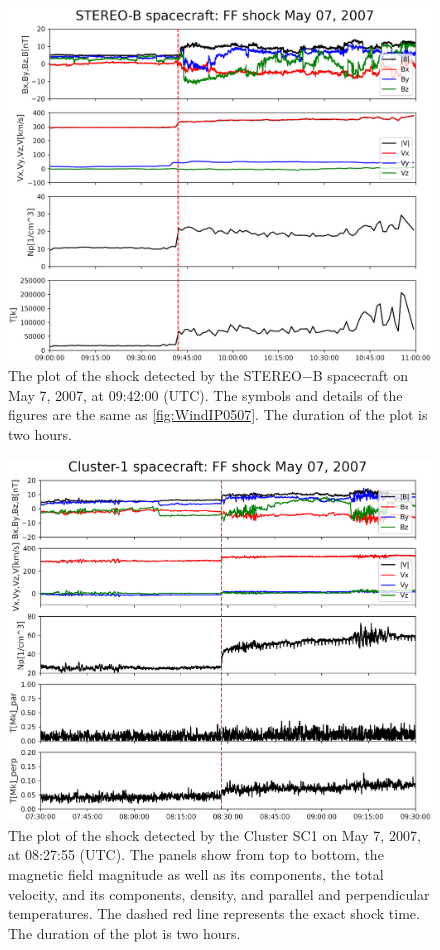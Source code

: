 \documentclass[draft]{agujournal2019}
\begin{document}
\pagebreak

\begin{figure}[!t]
\centering
\includegraphics[width=1.\textwidth]{jgr-2023-ipshocks-f03.eps}
\caption{The plot of the shock detected by the STEREO$-$B spacecraft on May 7, 2007, at {09:42:00} (UTC). The symbols and details of the figures are the same as \ref{fig:WindIP0507}. The duration of the plot is two hours.}
\label{fig:stbIP0507}
\end{figure}

\pagebreak

\begin{figure}[!t]
\centering
\includegraphics[width=1.\textwidth]{jgr-2023-ipshocks-f04.eps}
\caption{The plot of the shock detected by the Cluster SC1 on May 7, 2007, at 08:27:55 (UTC). The panels show from top to bottom, the magnetic field magnitude as well as its components, the total velocity, and its components, density, and parallel and perpendicular temperatures. The dashed red line represents the exact shock time. The duration of the plot is two hours.}
\label{fig:cl10507}
\end{figure}
\end{document}
